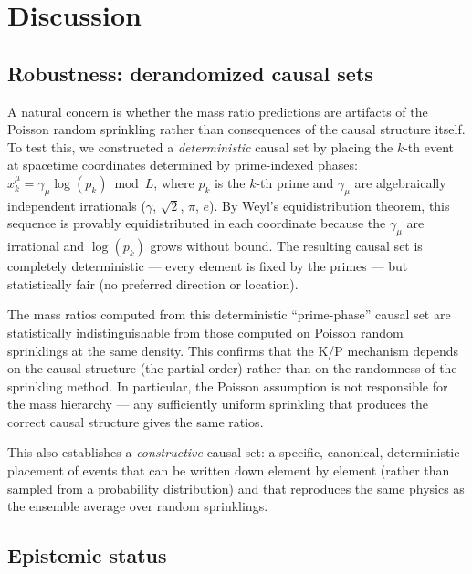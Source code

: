 \documentclass[11pt,letterpaper]{article}
\begin{document}
\section{Discussion}

\subsection{Robustness: derandomized causal sets}

A natural concern is whether the mass ratio predictions are artifacts
of the Poisson random sprinkling rather than consequences of the causal
structure itself.  To test this, we constructed a \emph{deterministic}
causal set by placing the $k$-th event at spacetime coordinates
determined by prime-indexed phases:
$x^\mu_k = \gamma_\mu \log(p_k) \bmod L$, where $p_k$ is the $k$-th
prime and $\gamma_\mu$ are algebraically independent irrationals
($\gamma$, $\sqrt{2}$, $\pi$, $e$).  By Weyl's equidistribution
theorem, this sequence is provably equidistributed in each coordinate
because the $\gamma_\mu$ are irrational and $\log(p_k)$ grows without
bound.  The resulting causal set is completely deterministic --- every
element is fixed by the primes --- but statistically fair (no preferred
direction or location).

The mass ratios computed from this deterministic ``prime-phase'' causal
set are statistically indistinguishable from those computed on Poisson
random sprinklings at the same density.  This confirms that the K/P
mechanism depends on the causal structure (the partial order) rather
than on the randomness of the sprinkling method.  In particular, the
Poisson assumption is not responsible for the mass hierarchy --- any
sufficiently uniform sprinkling that produces the correct causal
structure gives the same ratios.

This also establishes a \emph{constructive} causal set: a specific,
canonical, deterministic placement of events that can be written down
element by element (rather than sampled from a probability distribution)
and that reproduces the same physics as the ensemble average over
random sprinklings.

\subsection{Epistemic status}
\end{document}
